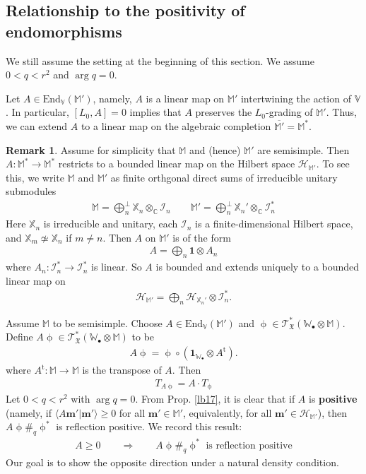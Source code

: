 \documentclass[11pt,b5paper,notitlepage]{article}
\theoremstyle{definition}
\newtheorem{rem}[df]{Remark}
\theoremstyle{plain}
\newcommand{\fk}{\mathfrak}
\newcommand{\mc}{\mathcal}
\newcommand{\ovl}{\overline}
\newcommand{\tr}{\mathrm{t}} %
\newcommand{\End}{\mathrm{End}} %
\newcommand{\id}{\mathbf{1}}
\newcommand{\bk}[1]{\langle {#1}\rangle}
\newcommand{\scr}{\mathscr}
\newcommand{\mbf}{\mathbf}
\newcommand{\blt}{\bullet}
\newcommand{\Vbb}{\mathbb V}
\newcommand{\Xbb}{\mathbb X}
\newcommand{\Wbb}{\mathbb W}
\newcommand{\Mbb}{\mathbb M}
\newcommand{\Cbb}{\mathbb C}
\numberwithin{equation}{section}
\begin{document}
\subsection{Relationship to the positivity of endomorphisms}




We still assume the setting at the beginning of this section. We assume $0<q<r^2$ and $\arg q=0$.

Let $A\in\End_\Vbb(\Mbb')$, namely, $A$ is a linear map on $\Mbb'$ intertwining the action of $\Vbb$. In particular, $[L_0,A]=0$ implies that $A$ preserves the $L_0$-grading of $\Mbb'$. Thus, we can extend $A$ to a linear map on the algebraic completion $\ovl{\Mbb'}=\Mbb^*$.

\begin{rem}\label{lb19}
Assume for simplicity that $\Mbb$ and (hence) $\Mbb'$ are semisimple. Then $A:\Mbb^*\rightarrow\Mbb^*$ restricts to a bounded linear map on the Hilbert space $\mc H_{\Mbb'}$. To see this, we write $\Mbb$ and $\Mbb'$ as finite orthgonal direct sums of irreducible unitary submodules
\begin{align} \label{eq28}
\Mbb=\bigoplus^\perp_n \Xbb_n\otimes_\Cbb \mc I_n\qquad \Mbb'=\bigoplus^\perp_n \Xbb_n'\otimes_\Cbb \mc I_n^*
\end{align}
Here $\Xbb_n$ is irreducible and unitary,  each $\mc I_n$ is a finite-dimensional Hilbert space, and $\Xbb_m\nsimeq\Xbb_n$ if $m\neq n$. Then $A$ on $\Mbb'$ is of the form
\begin{align}
A=\bigoplus_n \id\otimes A_n  \label{eq27}
\end{align}
where $A_n:\mc I_n^*\rightarrow \mc I_n^*$ is linear. So $A$ is bounded and extends uniquely to a bounded linear map on
\begin{align*}
\mc H_{\Mbb'}=\bigoplus_n\mc H_{\Xbb_n'}\otimes \mc I_n^*.
\end{align*}
\end{rem}



Assume $\Mbb$ to be semisimple. Choose $A\in\End_\Vbb(\Mbb')$ and $\upphi\in\scr T_{\fk X}^*(\Wbb_\blt\otimes\Mbb)$. Define $A\upphi\in\scr T_{\fk X}^*(\Wbb_\blt\otimes\Mbb)$ to be
\begin{align}
A\upphi=\upphi\circ(\id_{\Wbb_\blt}\otimes A^\tr). \label{eq61}
\end{align}
where $A^\tr:\Mbb\rightarrow\Mbb$ is the transpose of $A$. Then
\begin{align} \label{eq31}
T_{A\upphi}=A\cdot T_\upphi
\end{align} 
Let $0<q<r^2$ with $\arg q=0$. From Prop. \ref{lb17}, it is clear that if $A$ is \textbf{positive} (namely, if $\bk{A\mbf m'|\mbf m'}\geq 0$ for all $\mbf m'\in\Mbb'$, equivalently, for all $\mbf m'\in\mc H_{\Mbb'}$), then $A\upphi\#_q\upphi^*$ is reflection positive. We record this result:
\begin{align}\label{eq30}
A\geq 0\qquad\Longrightarrow\qquad A\upphi\#_q\upphi^*\text{ is reflection positive}
\end{align}
Our goal is to show the opposite direction under a natural density condition.
\end{document}
